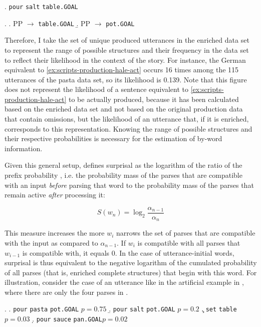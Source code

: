 \ex. \texttt{pour} \texttt{salt} \texttt{table.GOAL}

\ex. \a. PP $\rightarrow$ \texttt{table.GOAL}
     \b. PP $\rightarrow$ \texttt{pot.GOAL}

Therefore, I take the set of unique produced utterances in the enriched data set to represent the range of possible structures and their frequency in the data set to reflect their likelihood in the context of the story. For instance, the German equivalent to \ref{ex:scripts-production-hale-act} occurs 16 times among the 115 utterances of the pasta data set, so its likelihood is 0.139. Note that this figure does not represent the likelihood of a sentence equivalent to \ref{ex:scripts-production-hale-act} to be actually produced, because it has been calculated based on the enriched data set and not based on the original production data that contain omissions, but the likelihood of an utterance that, if it is enriched, corresponds to this representation. Knowing the range of possible structures and their respective probabilities is necessary for the estimation of by-word information.

Given this general setup, \citet{hale2001} defines surprisal as the logarithm of the ratio of the prefix probability \textalpha, i.e. the probability mass of the parses that are compatible with an input \textit{before} parsing that word to the probability mass of the parses that remain active \textit{after} processing it:

\begin{equation}
 \displaystyle S(w_n) = \log_2 \frac{\alpha_{n-1}}{\alpha_n}
\end{equation}

This measure increases the more $w_i$ narrows the set of parses that are compatible with the input as compared to $\alpha_{n-1}$. If $w_i$ is compatible with all parses that $w_{i-1}$ is compatible with, it equals 0. In the case of utterance-initial words, surprisal is thus equivalent to the negative logarithm of the cumulated probability of all parses (that is, enriched complete structures) that begin with this word.  For illustration, consider the case of an utterance like \Next[a] in the artificial example in \Next, where there are only the four parses in \Next[a--d].

\ex. \label{ex:contexts-pd} \a. \texttt{pour} \texttt{pasta} \texttt{pot.GOAL} \hfill $p = 0.75$\label{ex:contexts-a}
 \b. \texttt{pour} \texttt{salt} \texttt{pot.GOAL} \hfill $p = 0.2$\label{ex:contexts-b}
 \c. \texttt{set} \texttt{table} \hfill $p = 0.03$\label{ex:contexts-c}
 \d. \texttt{pour} \texttt{sauce} \texttt{pan.GOAL}\hfill  $p = 0.02$\label{ex:contexts-d}
 
